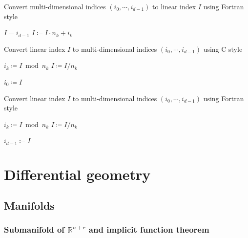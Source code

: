 \documentclass[11pt, a4paper]{book}
\begin{document}
\begin{breakablealgorithm}
  \caption{Convert multi-dimensional indices $(i_0,\cdots,i_{d-1})$ to linear index $I$ using Fortran style}
  \begin{algorithmic}[1]
    \State $I = i_{d-1}$
      \State $I \coloneqq I \cdot n_k + i_k$
    \EndFor
  \end{algorithmic}
\end{breakablealgorithm}

\begin{breakablealgorithm}
  \caption{Convert linear index $I$ to multi-dimensional indices $(i_0,\cdots,i_{d-1})$ using C style}
  \begin{algorithmic}[1]
      \State $i_{k} \coloneqq I \bmod n_k$
      \State $I \coloneqq I/n_k$
    \EndFor

    \State $i_0 \coloneqq I$
  \end{algorithmic}
\end{breakablealgorithm}

\begin{breakablealgorithm}
  \caption{Convert linear index $I$ to multi-dimensional indices $(i_0,\cdots,i_{d-1})$ using Fortran style}
  \begin{algorithmic}[1]
      \State $i_{k} \coloneqq I \bmod n_k$
      \State $I \coloneqq I/n_k$
    \EndFor

    \State $i_{d-1} \coloneqq I$
  \end{algorithmic}
\end{breakablealgorithm}

\chapter{Differential geometry}

\section{Manifolds}

\subsection{Submanifold of $\mathbb{R}^{n+r}$ and implicit function theorem}
\label{sec:submanifold-of-R}
\end{document}
